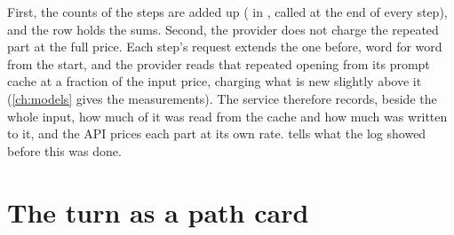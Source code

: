 First, the counts of the steps are added up ( in , called at
the end of every step), and the row holds the sums. Second, the provider does not charge the
repeated part at the full price. Each step's request extends the one before, word for word
from the start, and the provider reads that repeated opening from its prompt cache at a
fraction of the input price, charging what is new slightly above it (\cref{ch:models} gives
the measurements). The service therefore records, beside the whole input, how much of it was
read from the cache and how much was written to it, and the API prices each part at its own
rate.  tells what the log showed before this was done.


\section{The turn as a path card}\label{sec:chat:card}


